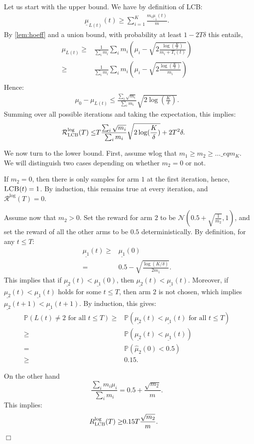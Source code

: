 Let us start with the upper bound. We have by definition of \textsc{LCB}:
\begin{align*}
    \underline{\mu}_{L(t)}(t)\geq \sum_{i=1}^K\frac{m_i \underline{\mu}_{i}(t)}{m}.
\end{align*}
By \cref{lem:hoeff} and a union bound, with probability at least $1-2T\delta$ this entails, 
\begin{align*}
    \mu_{L(t)}\geq &\frac{1}{\sum_i m_i}\sum_i m_i\left(\mu_i-\sqrt{2\frac{\log(\frac{K}{\delta})}{m_i+T_i(t)}}\right)\\
   \geq & \frac{1}{\sum_i m_i}\sum_i m_i\left(\mu_i-\sqrt{2\frac{\log(\frac{K}{\delta})}{m_i}}\right)\\
\end{align*}
Hence:
\begin{align}\label{eq:boundlcbaux}
    \mu_0-\mu_{L(t)}\leq \frac{\sum_i \sqrt{m_i}}{\sum_i m_i}\sqrt{2\log(\frac{K}{\delta})}.
\end{align}
Summing over all possible iterations and taking the expectation, this implies:
\begin{align*}
    \mathcal{R}_\textsc{LCB}^{\text{log}}(T)\leq &T\frac{\sum_i \sqrt{m_i}}{\sum_i m_i}\sqrt{2\log(\frac{K}{\delta})}+2T^2\delta.
\end{align*}

We now turn to the lower bound. First, assume wlog that $m_1\geq m_2\geq \ldots\_eq m_K$. We will distinguish two cases depending on whether $m_2=0$ or not. 

If $m_2=0$, then there is only samples for arm $1$ at the first iteration, hence, $\textsc{LCB}(t)=1$. By induction, this remains true at every iteration, and $\mathcal{R}^{\text{log}}(T)=0$.



Assume now that $m_2>0$. Set the reward for arm $2$ to be $\mathcal{N}(0.5+\sqrt{\frac{1}{m_2}},1)$, and set the reward of all the other arms to be $0.5$ deterministically. By definition, for any $t\leq T$:
\begin{align*}
\underline{\mu_1}(t)\geq &\underline{\mu_1}(0)\\ =&
0.5-\sqrt{\frac{\log(K/\delta)}{2m_1}}.
\end{align*}
This implies that if 
  $ \underline{\mu_2}(t)< \underline{\mu_1}(0)$, then   $ \underline{\mu_2}(t)< \underline{\mu_1}(t)$. Moreover, if $   \underline{\mu_2}(t)< \underline{\mu_1}(t)$ holds for some $t\leq T$, then arm $2$ is not chosen, which implies   $ \underline{\mu_2}(t+1)< \underline{\mu_1}(t+1)$. By induction, this gives:
\begin{align*}
\mathbb{P}\left(L(t) \neq 2 \text{ for all } t\leq T\right) \geq&\mathbb{P}\left(   \underline{\mu_2}(t)< \underline{\mu_1}(t) \text{ for all } t\leq T\right) \\
    \geq &\mathbb{P}\left(   \underline{\mu_2}(t)< \underline{\mu_1}(t) \right) \\
    =&\mathbb{P}\left(\hat{\mu}_2(0)< 0.5\right)\\
    \geq& 0.15. 
\end{align*}

On the other hand
\[
\frac{\sum_i m_i \mu_i}{\sum_i m_i}= 0.5 +\frac{\sqrt{m_2}}{m}.
\]
This implies:
\begin{align*}
  R_\textsc{LCB}^{\text{log}}(T)\geq& 0.15 T\frac{\sqrt{m_2}}{m}.
\end{align*}

\hfill \(\Box\)

